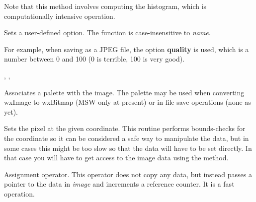 Note that this method involves computing the histogram, which is
computationally intensive operation.

\label{wximagesetoption}



Sets a user-defined option. The function is case-insensitive to {\it name}.

For example, when saving as a JPEG file, the option {\bf quality} is
used, which is a number between 0 and 100 (0 is terrible, 100 is very good).


,\rtfsp
{},\rtfsp
{}

\label{wximagesetpalette}


Associates a palette with the image. The palette may be used when converting
wxImage to wxBitmap (MSW only at present) or in file save operations (none as yet).

\label{wximagesetrgb}


Sets the pixel at the given coordinate. This routine performs bounds-checks
for the coordinate so it can be considered a safe way to manipulate the
data, but in some cases this might be too slow so that the data will have to
be set directly. In that case you will have to get access to the image data 
using the  method.



Assignment operator. This operator does not copy any data, but instead
passes a pointer to the data in {\it image} and increments a reference
counter. It is a fast operation.


